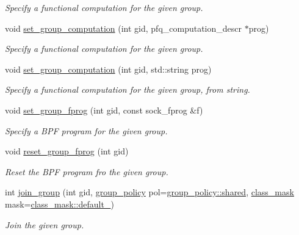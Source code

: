 \begin{DoxyCompactItemize}
\begin{DoxyCompactList}\small\item\em Specify a functional computation for the given group. \end{DoxyCompactList}\item 
void \hyperlink{classnet_1_1pfq_a50af39653699ccbf9c0b2412a17e01a6}{set\+\_\+group\+\_\+computation} (int gid, pfq\+\_\+computation\+\_\+descr $\ast$prog)
\begin{DoxyCompactList}\small\item\em Specify a functional computation for the given group. \end{DoxyCompactList}\item 
void \hyperlink{classnet_1_1pfq_a264d162d6b39d5cddc48ea1cef0b40f8}{set\+\_\+group\+\_\+computation} (int gid, std\+::string prog)
\begin{DoxyCompactList}\small\item\em Specify a functional computation for the given group, from string. \end{DoxyCompactList}\item 
void \hyperlink{classnet_1_1pfq_a5290b64ce270cfc46a9fbecc21802cc3}{set\+\_\+group\+\_\+fprog} (int gid, const sock\+\_\+fprog \&f)
\begin{DoxyCompactList}\small\item\em Specify a B\+P\+F program for the given group. \end{DoxyCompactList}\item 
void \hyperlink{classnet_1_1pfq_a4d6b1fb7c2b3538bf7b66fb0a92bf87b}{reset\+\_\+group\+\_\+fprog} (int gid)
\begin{DoxyCompactList}\small\item\em Reset the B\+P\+F program fro the given group. \end{DoxyCompactList}\item 
int \hyperlink{classnet_1_1pfq_ad7e62e04d59c1f2214ff5314bb6b3825}{join\+\_\+group} (int gid, \hyperlink{namespacenet_aedc1a0dde937ddbd0800af02920b1067}{group\+\_\+policy} pol=\hyperlink{namespacenet_aedc1a0dde937ddbd0800af02920b1067a9e81e7b963c71363e2fb3eefcfecfc0e}{group\+\_\+policy\+::shared}, \hyperlink{namespacenet_a1dbd93552dc6ef6fbb0bb79d43ca22fd}{class\+\_\+mask} mask=\hyperlink{namespacenet_a1dbd93552dc6ef6fbb0bb79d43ca22fda172b03053216c6158fe380805998ad6c}{class\+\_\+mask\+::default\+\_\+})
\begin{DoxyCompactList}\small\item\em Join the given group. \end{DoxyCompactList}\item 

\end{DoxyCompactItemize}
